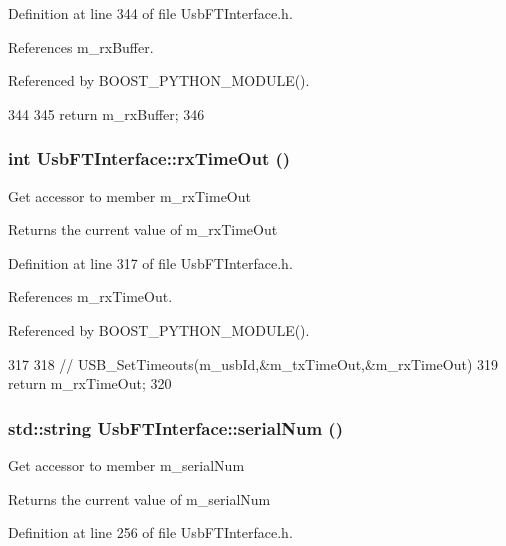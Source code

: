 Definition at line 344 of file UsbFTInterface.h.

References m\_\-rxBuffer.

Referenced by BOOST\_\-PYTHON\_\-MODULE().


\begin{DoxyCode}
344                   {
345     return m_rxBuffer;
346   }
\end{DoxyCode}
\hypertarget{classUsbFTInterface_ad95ffb87539ca86882e26fa24b00de97}{
\subsubsection[{rxTimeOut}]{\setlength{\rightskip}{0pt plus 5cm}int UsbFTInterface::rxTimeOut ()}}
\label{classUsbFTInterface_ad95ffb87539ca86882e26fa24b00de97}
Get accessor to member m\_\-rxTimeOut \begin{DoxyReturn}{Returns}
the current value of m\_\-rxTimeOut 
\end{DoxyReturn}


Definition at line 317 of file UsbFTInterface.h.

References m\_\-rxTimeOut.

Referenced by BOOST\_\-PYTHON\_\-MODULE().


\begin{DoxyCode}
317                    {
318     //    USB_SetTimeouts(m_usbId,&m_txTimeOut,&m_rxTimeOut)
319     return m_rxTimeOut;
320   }
\end{DoxyCode}
\hypertarget{classUsbFTInterface_ab4a2aa9664e903c57ae396faf643e7a3}{
\subsubsection[{serialNum}]{\setlength{\rightskip}{0pt plus 5cm}std::string UsbFTInterface::serialNum ()}}
\label{classUsbFTInterface_ab4a2aa9664e903c57ae396faf643e7a3}
Get accessor to member m\_\-serialNum \begin{DoxyReturn}{Returns}
the current value of m\_\-serialNum 
\end{DoxyReturn}


Definition at line 256 of file UsbFTInterface.h.

